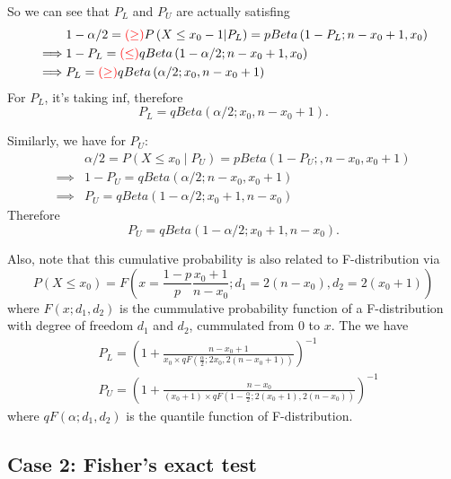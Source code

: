 \documentclass[a4paper,12pt]{article}
\begin{document}
So we can see that $P_L$ and $P_U$ are actually satisfing
\[
  \begin{aligned}
    & 1 - \alpha / 2
    ={\color{red}(\geq)}
    P\left(X \leq x_0 - 1\middle| P_L\right)
    = pBeta\left(1 - P_L; n - x_0 + 1, x_0\right)\\
    \implies & 1 - P_L = {\color{red}(\leq)} qBeta\left(1 - \alpha / 2; n - x_0 + 1 ,x_0\right)    \\
    \implies & P_L ={\color{red}(\geq)} qBeta\left(\alpha / 2; x_0, n - x_0 + 1\right) 
  \end{aligned}
\]
For $P_L$, it's taking $\mathrm{inf}$, therefore
\begin{equation}
  \label{eq:qbeta_pl}
  P_L = qBeta\left(\alpha / 2; x_0, n - x_0 + 1\right)
  .
\end{equation}

Similarly, we have for $P_U$:
\[
  \begin{aligned}
    &\alpha / 2 = P\left(X \leq x_0\middle| P_U\right)
    = pBeta\left(1 - P_U;, n - x_0, x_0 + 1\right)    \\
    \implies & 1 - P_U = qBeta\left(\alpha / 2; n - x_0, x_0 + 1\right)    \\
    \implies & P_U = qBeta\left(1 - \alpha / 2; x_0 + 1, n - x_0\right)
  \end{aligned}
\]
Therefore
\begin{equation}
  \label{eq:qbeta_pu}
  P_U = qBeta\left(1 - \alpha / 2; x_0 + 1, n - x_0\right)
  .
\end{equation}

Also, note that this cumulative probability is also related to F-distribution via
\[
  P\left(X\leq x_0\right) = F\left(
    x = \frac{1 - p}{p}\frac{x_0 + 1}{n - x_0};
    d_1 = 2\left(n - x_0\right),
    d_2 = 2\left(x_0 + 1\right)
  \right)
\]
where $F\left(x;d_1, d_2\right)$ is the cummulative probability function of a F-distribution with degree of freedom $d_1$ and $d_2$, cummulated from 0 to $x$. The we have
\begin{equation}
  \label{eq:qf_p}
  \begin{aligned}
    & P_L = \left(
      1 + \frac{n - x_0 + 1}{
        x_0 \times qF\left(\frac{\alpha}{2}; 2x_0, 2\left(n - x_0 + 1\right)\right)
      }
    \right)^{-1}    \\
    & P_U = \left(
      1 + \frac{n - x_0}{
        \left(x_0 + 1\right) \times
        qF\left(1 - \frac{\alpha}{2}; 2\left(x_0 + 1\right), 2\left(n - x_0\right)\right)
      }
    \right)^{-1}
  \end{aligned}
\end{equation}
where $qF\left(\alpha; d_1, d_2\right)$ is the quantile function of F-distribution.


\subsection{Case 2: Fisher's exact test}
\label{sec:case-2:-fishers}
\end{document}
